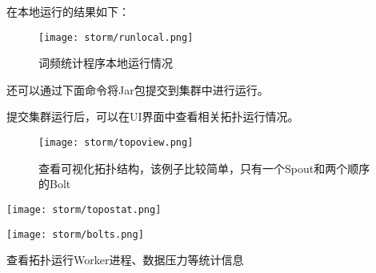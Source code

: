 在本地运行的结果如下：

\begin{figure}[h]
	\centering
	\texttt{[image: storm/runlocal.png]}
	\caption{词频统计程序本地运行情况}
	\label{fig:storm-run-local}
\end{figure}

还可以通过下面命令将Jar包提交到集群中进行运行。



提交集群运行后，可以在UI界面中查看相关拓扑运行情况。

\begin{figure}[h]
	\centering
	\texttt{[image: storm/topoview.png]}
	\caption{查看可视化拓扑结构，该例子比较简单，只有一个Spout和两个顺序的Bolt}
\end{figure}

\begin{center}
	\texttt{[image: storm/topostat.png]}

	\texttt{[image: storm/bolts.png]}

	查看拓扑运行Worker进程、数据压力等统计信息
\end{center}
